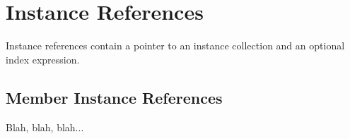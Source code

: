 \section{Instance References}
\label{sec:instance:reference}

Instance references contain a pointer to an instance collection
and an optional index expression.  

\subsection{Member Instance References}
\label{sec:instance:reference:member}

Blah, blah, blah...


